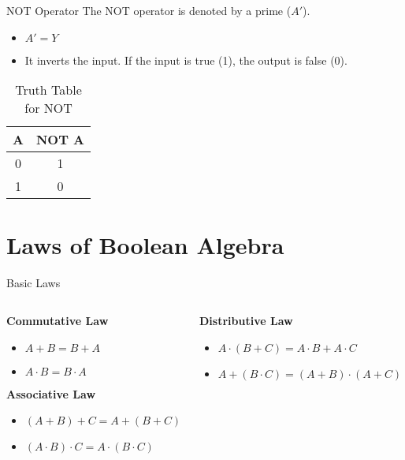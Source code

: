 \documentclass{beamer}
\begin{document}
\begin{frame}{NOT Operator}
    The NOT operator is denoted by a prime ($A'$).
    \begin{itemize}
        \item $A' = Y$
        \item It inverts the input. If the input is true (1), the output is
        false (0).
    \end{itemize}
    \begin{table}
        \centering
        \begin{tabular}{|c|c|}
            \hline
            \textbf{A} & \textbf{NOT A} \\
            \hline
            0 & 1 \\
            1 & 0 \\
            \hline
        \end{tabular}
        \caption{Truth Table for NOT}
    \end{table}
\end{frame}

\section{Laws of Boolean Algebra}
\begin{frame}{Basic Laws}
    \begin{columns}
        \begin{column}{0.5\textwidth}
            \textbf{Commutative Law}
            \begin{itemize}
                \item $A + B = B + A$
                \item $A \cdot B = B \cdot A$
            \end{itemize}
            \textbf{Associative Law}
            \begin{itemize}
                \item $(A + B) + C = A + (B + C)$
                \item $(A \cdot B) \cdot C = A \cdot (B \cdot C)$
            \end{itemize}
        \end{column}
        \begin{column}{0.5\textwidth}
            \textbf{Distributive Law}
            \begin{itemize}
                \item $A \cdot (B + C) = A \cdot B + A \cdot C$
                \item $A + (B \cdot C) = (A + B) \cdot (A + C)$
            \end{itemize}
        \end{column}
    \end{columns}
\end{frame}
\end{document}

